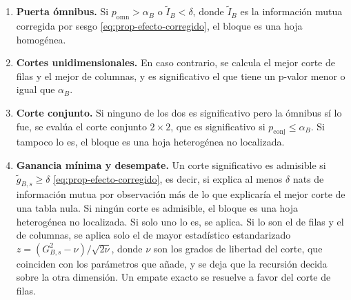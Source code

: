 \begin{enumerate}
  \item \textbf{Puerta ómnibus.} Si $p_{\mathrm{omn}}>\alpha_B$ o
  $\tilde I_B<\delta$, donde $\tilde I_B$ es la información mutua corregida por
  sesgo \eqref{eq:prop-efecto-corregido}, el bloque es una hoja
  homogénea.
  \item \textbf{Cortes unidimensionales.} En caso contrario, se calcula el mejor
  corte de filas y el mejor de columnas, y es significativo el que tiene un
  p-valor menor o igual que $\alpha_B$.
  \item \textbf{Corte conjunto.} Si ninguno de los dos es significativo pero
  la ómnibus sí lo fue, se evalúa el corte conjunto $2\times2$, que es
  significativo si $p_{\mathrm{conj}}\le\alpha_B$. Si tampoco lo es, el bloque es
  una hoja heterogénea no localizada.
  \item \textbf{Ganancia mínima y desempate.} Un corte significativo es
  admisible si $\tilde g_{B,s}\ge\delta$ \eqref{eq:prop-efecto-corregido}, es
  decir, si explica al menos $\delta$ nats de información mutua por observación
  más de lo que explicaría el mejor corte de una tabla nula. Si ningún corte es
  admisible, el bloque es una hoja heterogénea no localizada. Si solo uno lo es, se
  aplica. Si lo son el de filas y el de columnas, se aplica solo el de mayor
  estadístico estandarizado $z = (G^2_{B,s}-\nu)/\sqrt{2\nu}$, donde $\nu$ son
  los grados de libertad del corte, que coinciden con los parámetros que añade, y
  se deja que la recursión decida sobre la otra dimensión. Un empate exacto se
  resuelve a favor del corte de filas.
\end{enumerate}

